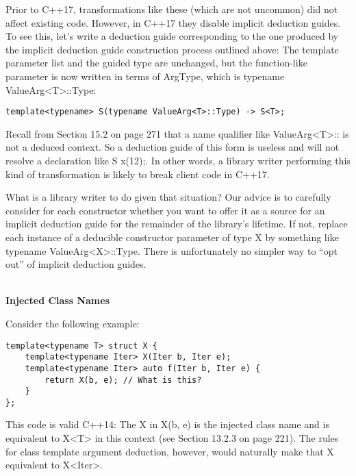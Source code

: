 Prior to C++17, transformations like these (which are not uncommon) did not affect existing code. However, in C++17 they disable implicit deduction guides. To see this, let’s write a deduction guide corresponding to the one produced by the implicit deduction guide construction process outlined above: The template parameter list and the guided type are unchanged, but the function-like parameter is now written in terms of ArgType, which is typename ValueArg<T>::Type:

\begin{lstlisting}[style=styleCXX]
template<typename> S(typename ValueArg<T>::Type) -> S<T>;
\end{lstlisting}

Recall from Section 15.2 on page 271 that a name qualifier like ValueArg<T>:: is not a deduced context. So a deduction guide of this form is useless and will not resolve a declaration like S x(12);. In other words, a library writer performing this kind of transformation is likely to break client code in C++17.

What is a library writer to do given that situation? Our advice is to carefully consider for each constructor whether you want to offer it as a source for an implicit deduction guide for the remainder of the library’s lifetime. If not, replace each instance of a deducible constructor parameter of type X by something like typename ValueArg<X>::Type. There is unfortunately no simpler way to “opt out” of implicit deduction guides.




\hspace*{\fill} \\ %
\noindent
\textbf{Injected Class Names}

Consider the following example:

\begin{lstlisting}[style=styleCXX]
template<typename T> struct X {
	template<typename Iter> X(Iter b, Iter e);
	template<typename Iter> auto f(Iter b, Iter e) {
		return X(b, e); // What is this?
	}
};
\end{lstlisting}

This code is valid C++14: The X in X(b, e) is the injected class name and is equivalent to X<T> in this context (see Section 13.2.3 on page 221). The rules for class template argument deduction, however, would naturally make that X equivalent to X<Iter>.


